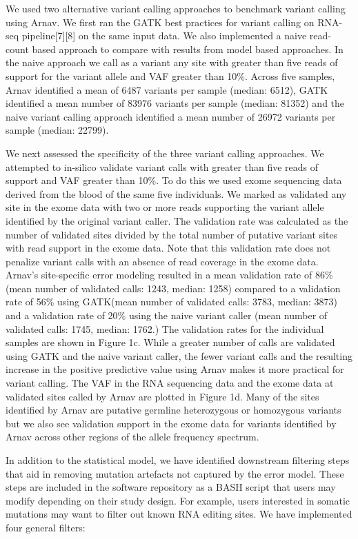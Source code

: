 We used two alternative variant calling approaches to benchmark variant calling using Arnav. We first ran the GATK best practices for variant calling on RNA-seq pipeline[7][8] on the same input data. We also implemented a naive read-count based approach to compare with results from model based approaches. In the naive approach we call as a variant any site with greater than five reads of support for the variant allele and VAF greater than 10\%. Across five samples, Arnav identified a mean of 6487 variants per sample (median: 6512), GATK identified a mean number of 83976 variants per sample (median: 81352) and the naive variant calling approach identified a mean number of 26972 variants per sample (median: 22799).

We next assessed the specificity of the three variant calling approaches. We attempted to in-silico validate variant calls with greater than five reads of support and VAF greater than 10\%. To do this we used exome sequencing data derived from the blood of the same five individuals. We marked as validated any site in the exome data with two or more reads supporting the variant allele identified by the original variant caller. The validation rate was calculated as the number of validated sites divided by the total number of putative variant sites with read support in the exome data. Note that this validation rate does not penalize variant calls with an absence of read coverage in the exome data. Arnav’s site-specific error modeling resulted in a mean validation rate of 86\% (mean number of validated calls: 1243, median: 1258) compared to a validation rate of 56\% using GATK(mean number of validated calls: 3783, median: 3873) and a validation rate of 20\% using the naive variant caller (mean number of validated calls: 1745, median: 1762.) The validation rates for the individual samples are shown in Figure 1c. While a greater number of calls are validated using GATK and the naive variant caller, the fewer variant calls and the resulting increase in the positive predictive value using Arnav makes it more practical for variant calling. The VAF in the RNA sequencing data and the exome data at validated sites called by Arnav are plotted in Figure 1d. Many of the sites identified by Arnav are putative germline heterozygous or homozygous variants but we also see validation support in the exome data for variants identified by Arnav across other regions of the allele frequency spectrum.

In addition to the statistical model, we have identified downstream filtering steps that aid in removing mutation artefacts not captured by the error model. These steps are included in the software repository as a BASH script that users may modify depending on their study design. For example, users interested in somatic mutations may want to filter out known RNA editing sites. We have implemented four general filters:


